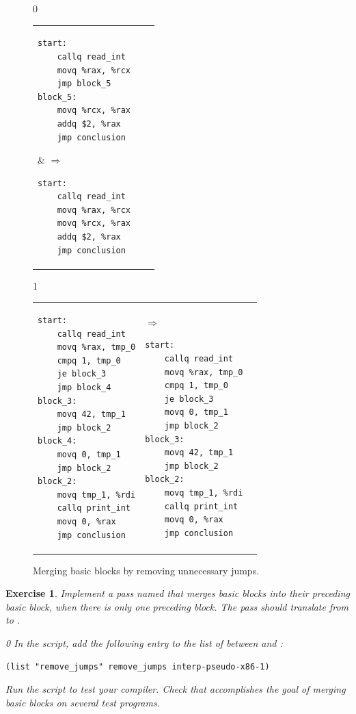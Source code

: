 \documentclass[7x10]{TimesAPriori_MIT}%
\def\racketEd{0}
\def\pythonEd{1}
\providecommand{\BookEdition}{1}
\let\edition\BookEdition
\newcommand{\pythonColor}[0]{}
\newtheorem{exercise}[theorem]{Exercise}
\numberwithin{theorem}{chapter}
\numberwithin{definition}{chapter}
\numberwithin{equation}{chapter}
\begin{document}
\begin{figure}[tbp]
\begin{tcolorbox}[colback=white]
{\if\edition\racketEd        
\begin{tabular}{lll}
\begin{minipage}{0.5\textwidth}
\begin{lstlisting}
start:
    callq read_int
    movq %rax, %rcx
    jmp block_5
block_5:
    movq %rcx, %rax
    addq $2, %rax
    jmp conclusion
\end{lstlisting}
\end{minipage}
&
$\Rightarrow\qquad$
\begin{minipage}{0.4\textwidth}
\begin{lstlisting}
start:
    callq read_int
    movq %rax, %rcx
    movq %rcx, %rax
    addq $2, %rax
    jmp conclusion
\end{lstlisting}
\end{minipage}
\end{tabular}
\fi}
{\if\edition\pythonEd\pythonColor
\begin{tabular}{lll}
\begin{minipage}{0.5\textwidth}
\begin{lstlisting}
start:
	callq read_int
	movq %rax, tmp_0
	cmpq 1, tmp_0
	je block_3
	jmp block_4
block_3:
	movq 42, tmp_1
	jmp block_2
block_4:
	movq 0, tmp_1
	jmp block_2
block_2:
	movq tmp_1, %rdi
	callq print_int
	movq 0, %rax
	jmp conclusion
\end{lstlisting}
\end{minipage}
&
$\Rightarrow\qquad$
\begin{minipage}{0.4\textwidth}
\begin{lstlisting}
start:
	callq read_int
	movq %rax, tmp_0
	cmpq 1, tmp_0
	je block_3
	movq 0, tmp_1
	jmp block_2
block_3:
	movq 42, tmp_1
	jmp block_2
block_2:
	movq tmp_1, %rdi
	callq print_int
	movq 0, %rax
	jmp conclusion
\end{lstlisting}
\end{minipage}
\end{tabular}
\fi}
\end{tcolorbox}

\caption{Merging basic blocks by removing unnecessary jumps.}
\label{fig:remove-jumps}
\end{figure}

\begin{exercise}\normalfont\normalsize
%
Implement a pass named  that merges basic blocks
into their preceding basic block, when there is only one preceding
block. The pass should translate from \LangXIfVar{} to \LangXIfVar{}.
%
{\if\edition\racketEd        
In the  script, add the following entry to the
list of  between 
and :
\begin{lstlisting}
(list "remove_jumps" remove_jumps interp-pseudo-x86-1)
\end{lstlisting}
\fi}
%
Run the script to test your compiler.
%
Check that  accomplishes the goal of merging basic
blocks on several test programs.
\end{exercise}
\end{document}
